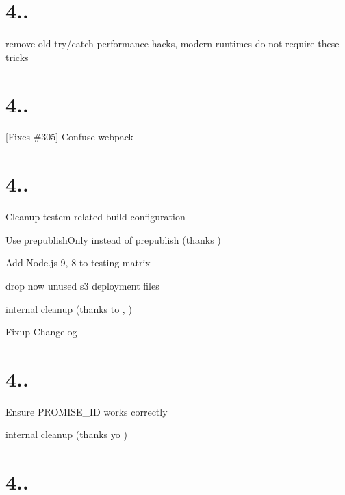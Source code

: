 \section*{4..}


\begin{DoxyItemize}
\item remove old try/catch performance hacks, modern runtimes do not require these tricks
\end{DoxyItemize}

\section*{4..}


\begin{DoxyItemize}
\item \mbox{[}Fixes \#305\mbox{]} Confuse webpack
\end{DoxyItemize}

\section*{4..}


\begin{DoxyItemize}
\item Cleanup testem related build configuration
\item Use {\ttfamily prepublish\+Only} instead of {\ttfamily prepublish} (thanks )
\item Add Node.\+js 9, 8 to testing matrix
\item drop now unused s3 deployment files
\item internal cleanup (thanks to , )
\item Fixup Changelog
\end{DoxyItemize}

\section*{4..}


\begin{DoxyItemize}
\item Ensure P\+R\+O\+M\+I\+S\+E\+\_\+\+ID works correctly
\item internal cleanup (thanks yo )
\end{DoxyItemize}

\section*{4..}


